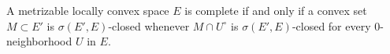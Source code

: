 A metrizable locally convex space $E$ is complete if and only if a convex set $M \subset E'$ is $\sigma(E', E)$-closed whenever $M \cap U^\circ$ is $\sigma(E', E)$-closed for every $0$-neighborhood $U$ in $E$.